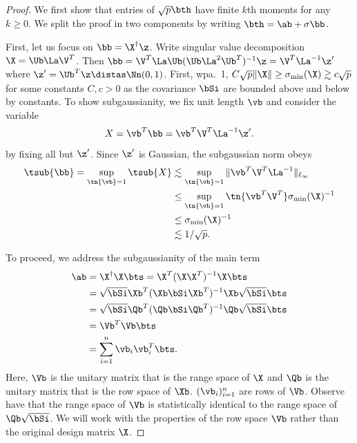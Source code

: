 \begin{proof} We first show that entries of $\sqrt{p}\bth$ have finite $k$th moments for any $k\geq 0$. We split the proof in two components by writing $\bth=\ab+\sigma \bb$. 

First, let us focus on $\bb=\X^\dagger\z$. Write singular value decomposition $\X=\Ub\La\V^T$. Then $\bb=\V^T\La\Ub(\Ub\La^2\Ub^T)^{-1}\z=\V^T\La^{-1}\z'$ where $\z'=\Ub^T\z\distas\Nn(0,1)$. First, wpa.~1, $C\sqrt{p} \|\X\|\geq \sigma_{\min}(\X)\gtrsim c\sqrt{p}$ for some constants $C,c>0$ as the covariance $\bSi$ are bounded above and below by constants. To show subgaussianity, we fix unit length $\vb$ and consider the variable
\[
X=\vb^T\bb=\vb^T\V^T\La^{-1}\z'.
\]
by fixing all but $\z'$. Since $\z'$ is Gaussian, the subgaussian norm obeys 
\begin{align}
\tsub{\bb}=\sup_{\tn{\vb}=1}\tsub{X}&\lesssim \sup_{\tn{\vb}=1}\|\vb^T\V^T\La^{-1}\|_{\ell_\infty}\\
&\leq\sup_{\tn{\vb}=1} \tn{\vb^T\V^T}\sigma_{\min}(\X)^{-1}\\
&\leq \sigma_{\min}(\X)^{-1}\\
&\lesssim 1/\sqrt{p}.
\end{align}

To proceed, we address the subgaussianity of the main term 
\begin{align}
\ab&=\X^\dagger\X\bts=\X^T(\X\X^T)^{-1}\X\bts\\
&=\sqrt{\bSi}\Xb^T(\Xb\bSi\Xb^T)^{-1}\Xb\sqrt{\bSi}\bts\\
&=\sqrt{\bSi}\Qb^T (\Qb\bSi\Qb^T)^{-1}\Qb\sqrt{\bSi}\bts\\
&=\Vb^T\Vb\bts\\
&=\sum_{i=1}^n \vb_i\vb_i^T\bts.
\end{align} 
Here, $\Vb$ is the unitary matrix that is the range space of $\X$ and $\Qb$ is the unitary matrix that is the row space of $\Xb$. $(\vb_i)_{i=1}^n$ are rows of $\Vb$. Observe have that the range space of $\Vb$ is statistically identical to the range space of $\Qb\sqrt{\bSi}$. We will work with the properties of the row space $\Vb$ rather than the original design matrix $\X$. 


\end{proof}
